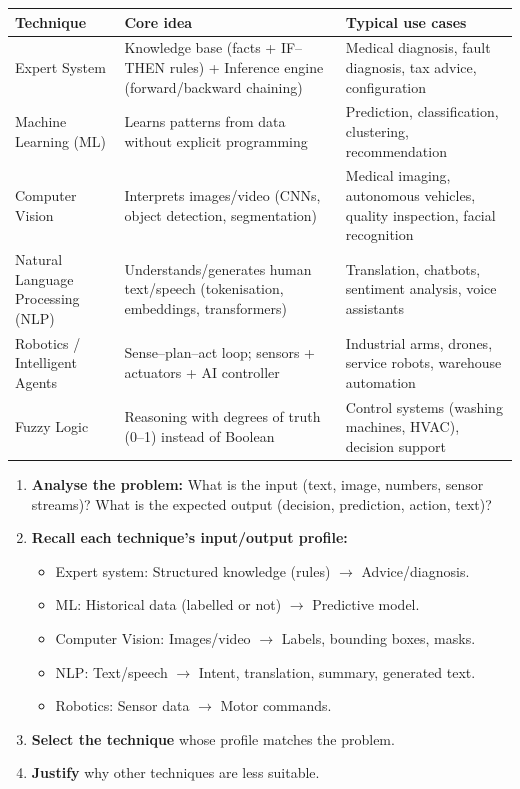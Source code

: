 \documentclass[11pt]{article}
\begin{document}
\begin{aretenir}
\begin{center}
\begin{tabularx}{\linewidth}{|l|X|X|}
\hline
\rowcolor{popblueL} \textbf{Technique} & \textbf{Core idea} & \textbf{Typical use cases} \\
\hline
Expert System & Knowledge base (facts + IF--THEN rules) + Inference engine (forward/backward chaining) & Medical diagnosis, fault diagnosis, tax advice, configuration \\
\hline
Machine Learning (ML) & Learns patterns from data without explicit programming & Prediction, classification, clustering, recommendation \\
\hline
Computer Vision & Interprets images/video (CNNs, object detection, segmentation) & Medical imaging, autonomous vehicles, quality inspection, facial recognition \\
\hline
Natural Language Processing (NLP) & Understands/generates human text/speech (tokenisation, embeddings, transformers) & Translation, chatbots, sentiment analysis, voice assistants \\
\hline
Robotics / Intelligent Agents & Sense–plan–act loop; sensors + actuators + AI controller & Industrial arms, drones, service robots, warehouse automation \\
\hline
Fuzzy Logic & Reasoning with degrees of truth (0–1) instead of Boolean & Control systems (washing machines, HVAC), decision support \\
\hline
\end{tabularx}
\end{center}
\end{aretenir}

\begin{methode}
\begin{enumerate}
\item \textbf{Analyse the problem:} What is the input (text, image, numbers, sensor streams)? What is the expected output (decision, prediction, action, text)?
\item \textbf{Recall each technique's input/output profile:}
\begin{itemize}
\item Expert system: Structured knowledge (rules) $\rightarrow$ Advice/diagnosis.
\item ML: Historical data (labelled or not) $\rightarrow$ Predictive model.
\item Computer Vision: Images/video $\rightarrow$ Labels, bounding boxes, masks.
\item NLP: Text/speech $\rightarrow$ Intent, translation, summary, generated text.
\item Robotics: Sensor data $\rightarrow$ Motor commands.
\end{itemize}
\item \textbf{Select the technique} whose profile matches the problem.
\item \textbf{Justify} why other techniques are less suitable.
\end{enumerate}
\end{methode}
\end{document}
